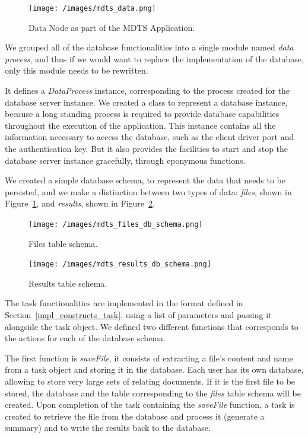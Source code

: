 \documentclass[12pt, titlepage]{uo_temp}
\begin{document}
     \begin{figure}
       \texttt{[image: /images/mdts\_data.png]}
       \caption{Data Node as part of the MDTS Application.}
     \end{figure}
    
     We grouped all of the database functionalities into a single module named
     \emph{data process}, and thus if we would want to replace the implementation of the
     database, only this module needs to be rewritten.
     
     It defines a \emph{DataProcess} instance, corresponding to the process created for
     the database server instance. We created a class to represent a database instance,
     because a long standing process is required to provide database capabilities
     throughout the execution of the application. This instance contains all the
     information necessary to access the database, such as the client driver port and the
     authentication key. But it also provides the facilities to start and stop the database
     server instance gracefully, through eponymous functions.

     We created a simple database schema, to represent the data that needs to be
     persisted, and we make a distinction between two types of data: \emph{files}, shown
     in Figure~\ref{files_scm}, and \emph{results}, shown in Figure~\ref{results_scm}.
     
     \begin{figure}
       \texttt{[image: /images/mdts\_files\_db\_schema.png]}
       \caption{Files table schema.}\label{files_scm}
     \end{figure}

     \begin{figure}
       \texttt{[image: /images/mdts\_results\_db\_schema.png]}
       \caption{Results table schema.}\label{results_scm}
     \end{figure}

     The task functionalities are implemented in the format defined in
     Section~\ref{impl_constructs_task}, using a list of parameters and passing it
     alongside the task object. We defined two different functions that corresponds to the
     actions for each of the database schema.
     
     The first function is \emph{saveFile}, it consists of extracting a file's content and
     name from a task object and storing it in the database. Each user has its own
     database, allowing to store very large sets of relating documents. If it is the first
     file to be stored, the database and the table corresponding to the \emph{files} table
     schema will be created. Upon completion of the task containing the \emph{saveFile}
     function, a task is created to retrieve the file from the database and process it
     (generate a summary) and to write the results back to the database.
     
\end{document}
